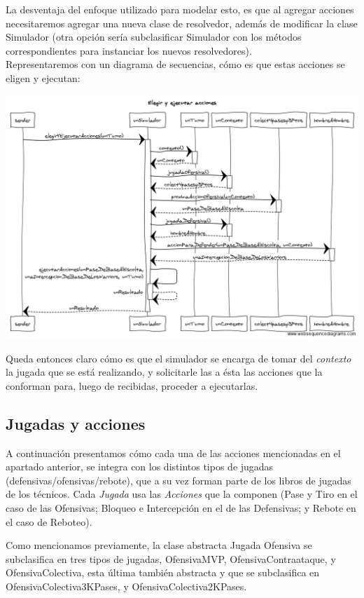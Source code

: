 La desventaja del enfoque utilizado para modelar esto, es que al agregar acciones necesitaremos agregar una nueva clase de resolvedor, además de modificar la clase Simulador (otra opción sería subclasificar Simulador con los métodos correspondientes para instanciar los nuevos resolvedores).\\


Representaremos con un diagrama de secuencias, cómo es que estas acciones se eligen y ejecutan:
\begin{center}
\includegraphics[scale=0.4]{diseno/Elegir_y_ejecutar_acciones.png}
\end{center}
Queda entonces claro cómo es que el simulador se encarga de tomar del \textit{contexto} la jugada que se está realizando, y solicitarle las a ésta las acciones que la conforman para, luego de recibidas, proceder a ejecutarlas.

\subsection{Jugadas y acciones}
A continuación presentamos cómo cada una de las acciones mencionadas en el apartado anterior, se integra con los distintos tipos de jugadas (defensivas/ofensivas/rebote), que a su vez forman parte de los libros de jugadas de los técnicos. Cada \textit{Jugada} usa las \textit{Acciones} que la componen (Pase y Tiro en el caso de las Ofensivas; Bloqueo e Intercepción en el de las Defensivas; y Rebote en el caso de Reboteo).

Como mencionamos previamente, la clase abstracta Jugada Ofensiva se subclasifica en tres tipos de jugadas, OfensivaMVP, OfensivaContraataque, y OfensivaColectiva, esta última también abstracta y que se subclasifica en OfensivaColectiva3KPases, y OfensivaColectiva2KPases.

